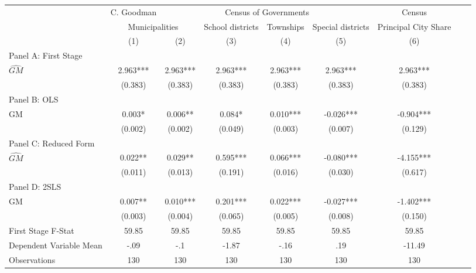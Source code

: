 \begin{tabular}{l*{8}{c}} \toprule
&\multicolumn{1}{c}{C. Goodman}&\multicolumn{4}{c}{Census of Governments}&\multicolumn{1}{c}{Census}\\\cmidrule(lr){2-2}\cmidrule(lr){3-6}\cmidrule(lr){7-7}
&\multicolumn{2}{c}{Municipalities}&\multicolumn{1}{c}{School districts}&\multicolumn{1}{c}{Townships}&\multicolumn{1}{c}{Special districts}&\multicolumn{1}{c}{Principal City Share}\\\cmidrule(lr){2-3}\cmidrule(lr){4-6}\cmidrule(lr){7-7}
&\multicolumn{1}{c}{(1)}&\multicolumn{1}{c}{(2)}&\multicolumn{1}{c}{(3)}&\multicolumn{1}{c}{(4)}&\multicolumn{1}{c}{(5)}&\multicolumn{1}{c}{(6)}\\
\cmidrule(lr){1-7}
\multicolumn{6}{l}{Panel A: First Stage}\\
\cmidrule(lr){1-7}
$\widehat{GM}$  &    2.963***&    2.963***&    2.963***&    2.963***&    2.963***&    2.963***\\
                &  (0.383)   &  (0.383)   &  (0.383)   &  (0.383)   &  (0.383)   &  (0.383)   \\
\cmidrule(lr){1-7}
\multicolumn{6}{l}{Panel B: OLS}\\
\cmidrule(lr){1-7}
GM              &    0.003*  &    0.006** &    0.084*  &    0.010***&   -0.026***&   -0.904***\\
                &  (0.002)   &  (0.002)   &  (0.049)   &  (0.003)   &  (0.007)   &  (0.129)   \\
\cmidrule(lr){1-7}
\multicolumn{6}{l}{Panel C: Reduced Form}\\
\cmidrule(lr){1-7}
$\widehat{GM}$  &    0.022** &    0.029** &    0.595***&    0.066***&   -0.080***&   -4.155***\\
                &  (0.011)   &  (0.013)   &  (0.191)   &  (0.016)   &  (0.030)   &  (0.617)   \\
\cmidrule(lr){1-7}
\multicolumn{6}{l}{Panel D: 2SLS}\\
\cmidrule(lr){1-7}
GM              &    0.007** &    0.010***&    0.201***&    0.022***&   -0.027***&   -1.402***\\
                &  (0.003)   &  (0.004)   &  (0.065)   &  (0.005)   &  (0.008)   &  (0.150)   \\
\midrule
First Stage F-Stat&    59.85   &    59.85   &    59.85   &    59.85   &    59.85   &    59.85   \\
Dependent Variable Mean&     -.09   &      -.1   &    -1.87   &     -.16   &      .19   &   -11.49   \\
Observations    &      130   &      130   &      130   &      130   &      130   &      130   \\
       \bottomrule \end{tabular}
